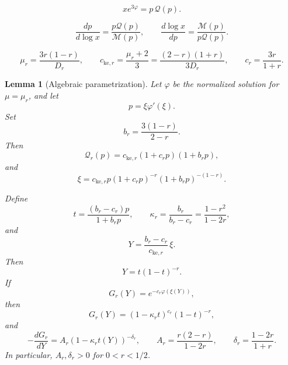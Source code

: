 \documentclass[10pt,a4paper]{amsart}
\newtheorem{lemma}{Lemma}
\begin{document}
\begin{equation}\label{eq:first-integral}
 x e^{3\varphi}=p\,\mathcal Q(p).
\end{equation}

\begin{equation}\label{eq:p-separable}
 \frac{dp}{d\log x}
 =\frac{p\mathcal Q(p)}{\mathcal M(p)},
 \qquad
 \frac{d\log x}{dp}
 =\frac{\mathcal M(p)}{p\mathcal Q(p)}.
\end{equation}

\begin{equation}\label{eq:mu-c-r}
 \mu_r=\frac{3r(1-r)}{D_r},
 \qquad
 c_{\mathrm{ke},r}=\frac{\mu_r+2}{3}
 =\frac{(2-r)(1+r)}{3D_r},
 \qquad
 c_r=\frac{3r}{1+r}.
\end{equation}

\begin{lemma}[Algebraic parametrization]
\label{lem:algebraic-uniformization}
Let \(\varphi\) be the normalized solution for \(\mu=\mu_r\), and let
\[
 p=\xi\varphi'(\xi).
\]
Set
\begin{equation}\label{eq:b-r}
 b_r=\frac{3(1-r)}{2-r}.
\end{equation}
Then
\begin{equation}\label{eq:Q-factor}
 \mathcal Q_r(p)
 =c_{\mathrm{ke},r}(1+c_rp)(1+b_rp),
\end{equation}
and
\begin{equation}\label{eq:xi-p-factor}
 \xi=c_{\mathrm{ke},r}
 p(1+c_rp)^{-r}(1+b_rp)^{-(1-r)}.
\end{equation}

Define
\begin{equation}\label{eq:t-kappa}
 t=\frac{(b_r-c_r)p}{1+b_rp},
 \qquad
 \kappa_r=\frac{b_r}{b_r-c_r}
 =\frac{1-r^2}{1-2r},
\end{equation}
and
\begin{equation}\label{eq:Y-def}
 Y=\frac{b_r-c_r}{c_{\mathrm{ke},r}}\,\xi.
\end{equation}
Then
\begin{equation}\label{eq:Y-t}
 Y=t(1-t)^{-r}.
\end{equation}
If
\begin{equation}\label{eq:G-def}
 G_r(Y)=e^{-c_r\varphi(\xi(Y))},
\end{equation}
then
\begin{equation}\label{eq:G-t}
 G_r(Y)=(1-\kappa_rt)^{c_r}(1-t)^{-r},
\end{equation}
and
\begin{equation}\label{eq:derivative-cancellation}
 -\frac{dG_r}{dY}
 =A_r(1-\kappa_rt(Y))^{-\delta_r},
 \qquad
 A_r=\frac{r(2-r)}{1-2r},
 \qquad
 \delta_r=\frac{1-2r}{1+r}.
\end{equation}
In particular, \(A_r,\delta_r>0\) for \(0<r<1/2\).
\end{lemma}
\end{document}
